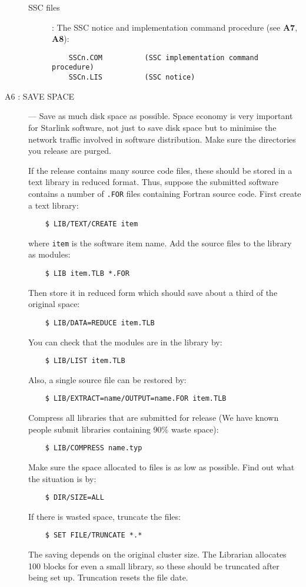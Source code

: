 \begin{description}
\begin{description}
\item [SSC files]:
The SSC notice and implementation command procedure (see {\bf A7}, {\bf A8}):
\begin{verbatim}
    SSCn.COM          (SSC implementation command procedure)
    SSCn.LIS          (SSC notice)
\end{verbatim}
\end{description}

\item [A6 : SAVE SPACE] ---
Save as much disk space as possible.
Space economy is very important for Starlink software, not just to save disk
space but to minimise the network traffic involved in software distribution.
Make sure the directories you release are purged.

If the release contains many source code files, these should be stored in a text
library in reduced format.
Thus, suppose the submitted software contains a number of {\tt *.FOR} files
containing Fortran source code.
First create a text library:
\begin{verbatim}
    $ LIB/TEXT/CREATE item
\end{verbatim}
where {\tt item} is the software item name.
Add the source files to the library as modules:
\begin{verbatim}
    $ LIB item.TLB *.FOR
\end{verbatim}
Then store it in reduced form which should save about a third of the original
space:
\begin{verbatim}
    $ LIB/DATA=REDUCE item.TLB
\end{verbatim}
You can check that the modules are in the library by:
\begin{verbatim}
    $ LIB/LIST item.TLB
\end{verbatim}
Also, a single source file can be restored by:
\begin{verbatim}
    $ LIB/EXTRACT=name/OUTPUT=name.FOR item.TLB
\end{verbatim}
Compress all libraries that are submitted for release
(We have known people submit libraries containing 90\% waste space):
\begin{verbatim}
    $ LIB/COMPRESS name.typ
\end{verbatim}
Make sure the space allocated to files is as low as possible.
Find out what the situation is by:
\begin{verbatim}
    $ DIR/SIZE=ALL
\end{verbatim}
If there is wasted space, truncate the files:
\begin{verbatim}
    $ SET FILE/TRUNCATE *.*
\end{verbatim}
The saving depends on the original cluster size.
The Librarian allocates 100 blocks for even a small library, so these should be
truncated after being set up.
Truncation resets the file date.


\end{description}
